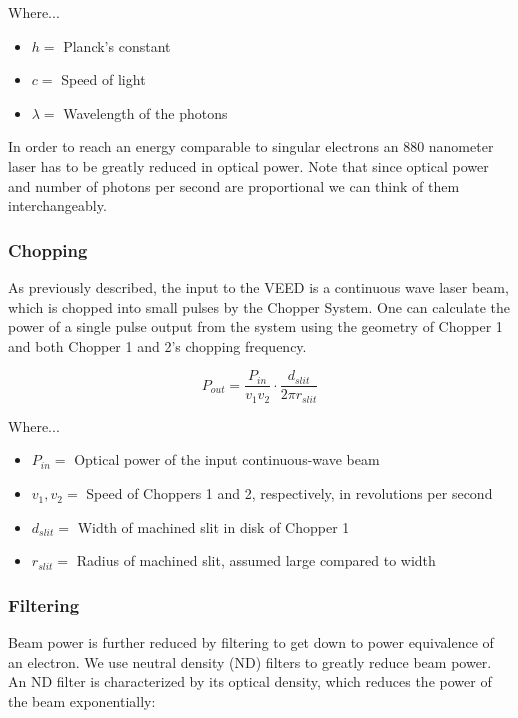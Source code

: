 \documentclass{article}
\begin{document}
    Where...
    \begin{itemize}
        \item $h = $ Planck's constant 
        \item $c = $ Speed of light
        \item $\lambda = $ Wavelength of the photons
    \end{itemize}
    
    \noindent In order to reach an energy comparable to singular electrons an 880 nanometer laser has to be greatly reduced in optical power. Note that since optical power and number of photons per second are proportional we can think of them interchangeably.
    
    \subsubsection{Chopping}
    
     As previously described, the input to the VEED is a continuous wave laser beam, which is chopped into small pulses by the Chopper System. One can calculate the power of a single pulse output from the system using the geometry of Chopper 1 and both Chopper 1 and 2's chopping frequency.
    
    \begin{equation}
        P_{out} = \frac{P_{in}}{v_1 v_2} \cdot \frac{d_{slit}}{2\pi r_{slit}}
    \end{equation}
    
    Where...
    \begin{itemize}
        \item $P_{in} = $ Optical power of the input continuous-wave beam
        \item $v_1, v_2 = $ Speed of Choppers 1 and 2, respectively, in revolutions per second
        \item $d_{slit} = $ Width of machined slit in disk of Chopper 1
        \item $r_{slit} = $ Radius of machined slit, assumed large compared to width
    \end{itemize}
    
    \subsubsection{Filtering}
    
    Beam power is further reduced by filtering to get down to power equivalence of an electron. We use neutral density (ND) filters to greatly reduce beam power. An ND filter is characterized by its optical density, which reduces the power of the beam exponentially:
    
\end{document}

